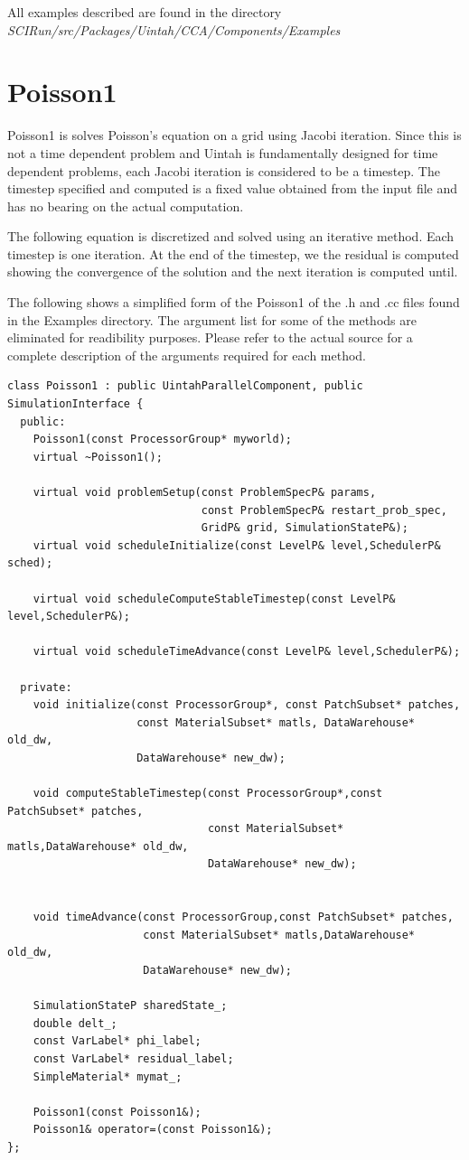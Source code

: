 \documentclass[12pt]{report}
\begin{document}
All examples described are found in the directory
\emph{SCIRun/src/Packages/Uintah/CCA/Components/Examples}

\section{Poisson1}

Poisson1 is solves Poisson's equation on a grid using Jacobi
iteration.  Since this is not a time dependent problem and Uintah is
fundamentally designed for time dependent problems, each Jacobi
iteration is considered to be a timestep.  The timestep specified and
computed is a fixed value obtained from the input file and has no
bearing on the actual computation.

The following equation is discretized and solved using an iterative
method. Each timestep is one iteration. At the end of the timestep, we
the residual is computed showing the convergence of the solution and
the next iteration is computed until.

The following shows a simplified form of the Poisson1 of the .h and
.cc files found in the Examples directory.  The argument list for some
of the methods are eliminated for readibility purposes.  Please refer
to the actual source for a complete description of the arguments
required for each method.

\begin{Verbatim}[fontsize=\footnotesize]
class Poisson1 : public UintahParallelComponent, public SimulationInterface {
  public:
    Poisson1(const ProcessorGroup* myworld);
    virtual ~Poisson1();

    virtual void problemSetup(const ProblemSpecP& params,
                              const ProblemSpecP& restart_prob_spec,
                              GridP& grid, SimulationStateP&);
    virtual void scheduleInitialize(const LevelP& level,SchedulerP& sched);

    virtual void scheduleComputeStableTimestep(const LevelP& level,SchedulerP&);

    virtual void scheduleTimeAdvance(const LevelP& level,SchedulerP&);

  private:
    void initialize(const ProcessorGroup*, const PatchSubset* patches,
                    const MaterialSubset* matls, DataWarehouse* old_dw,
                    DataWarehouse* new_dw);

    void computeStableTimestep(const ProcessorGroup*,const PatchSubset* patches,
                               const MaterialSubset* matls,DataWarehouse* old_dw,
                               DataWarehouse* new_dw);


    void timeAdvance(const ProcessorGroup,const PatchSubset* patches,
                     const MaterialSubset* matls,DataWarehouse* old_dw,
                     DataWarehouse* new_dw);

    SimulationStateP sharedState_;
    double delt_;
    const VarLabel* phi_label;
    const VarLabel* residual_label;
    SimpleMaterial* mymat_;

    Poisson1(const Poisson1&);
    Poisson1& operator=(const Poisson1&);
};
\end{Verbatim}
\end{document}

